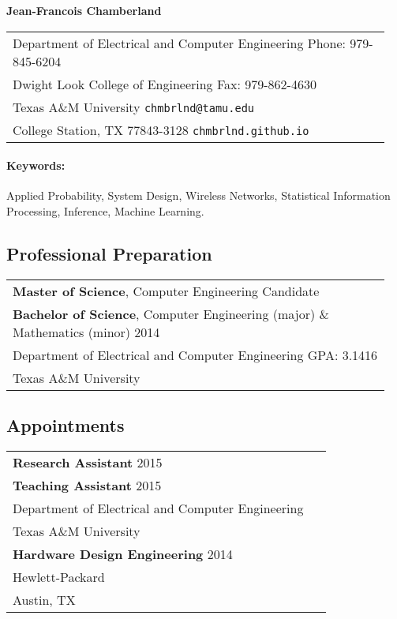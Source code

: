 \documentclass[11pt]{article}
\begin{document}
\begin{center}
{\bfseries \Large Jean-Francois Chamberland}
\end{center}

\begin{center}
\begin{tabular}{p{0.95\linewidth}}
Department of Electrical and Computer Engineering
\hfill Phone: 979-845-6204 \\
Dwight Look College of Engineering
\hfill Fax: 979-862-4630 \\
Texas A\&M University
\hfill \texttt{chmbrlnd@tamu.edu} \\
College Station, TX 77843-3128
\hfill \texttt{chmbrlnd.github.io}
\end{tabular}
\end{center}

\paragraph{Keywords:} Applied Probability, System Design, Wireless Networks, Statistical Information Processing, Inference, Machine Learning.

\subsection*{Professional Preparation}

\begin{center}
\begin{tabular}{p{0.95\linewidth}}
\textbf{Master of Science}, Computer Engineering \hfill Candidate \\
\textbf{Bachelor of Science}, Computer Engineering (major) \& Mathematics (minor) \hfill 2014 \\
Department of Electrical and Computer Engineering \hfill GPA: 3.1416\\
Texas A\&M University
\end{tabular}
\end{center}


\subsection*{Appointments}

\begin{center}
\begin{tabular}{p{0.95\linewidth}}
\textbf{Research Assistant} \hfill 2015 \\
\textbf{Teaching Assistant} \hfill 2015\\
Department of Electrical and Computer Engineering \\
Texas A\&M University \\[4pt]
\textbf{Hardware Design Engineering} \hfill 2014 \\
Hewlett-Packard \\
Austin, TX
\end{tabular}
\end{center}
\end{document}
